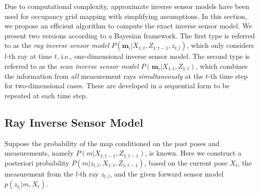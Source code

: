 \documentclass[letterpaper, 10pt, conference]{ieeeconf}
\begin{document}
Due to computational complexity, approximate inverse sensor models have been used for occupancy grid mapping with simplifying assumptions. In this section, we propose an efficient algorithm to compute the exact inverse sensor model. 
We present two versions according to a Bayesian framework. The first type is referred to as the \emph{ray inverse sensor model} $P(\mathbf{m}_i|X_{1:t},Z_{1:t-1},z_{t,l})$, which only considers $l$-th ray at time $t$, i.e., one-dimensional inverse sensor model. The second type is referred to as the \emph{scan inverse sensor model} $P(\mathbf{m}_i|X_{1:t},Z_{1:t})$, which combines the information from \emph{all} measurement rays \emph{simultaneously} at the $t$-th time step for two-dimensional cases. These are developed in a sequential form to be repeated at each time step.



\subsection{Ray Inverse Sensor Model}

Suppose the probability of the map conditioned on the past poses and measurements, namely $P(m|X_{1:t-1},Z_{1:t-1})$, is known. Here we construct a posteriori probability $P(m|z_{t,l},X_{1:t},Z_{1:t-1})$, based on the current pose $X_t$, the measurement from the $l$-th ray $z_{t,l}$, and the given forward sensor model $p(z_{t_l}|m,X_t)$.
\end{document}
